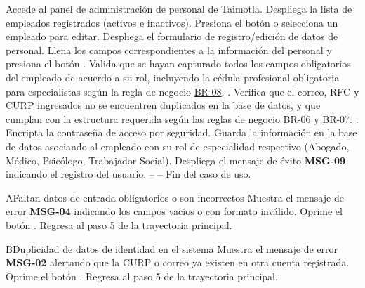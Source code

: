  \begin{UCtrayectoria}
 	\UCpaso[\UCactor] Accede al panel de administración de personal de Taimotla.
 	\UCpaso Despliega la lista de empleados registrados (activos e inactivos).
 	\UCpaso[\UCactor] Presiona el botón  o selecciona un empleado para editar.
 	\UCpaso Despliega el formulario de registro/edición de datos de personal.
 	\UCpaso[\UCactor] Llena los campos correspondientes a la información del personal y presiona el botón .
 	\UCpaso Valida que se hayan capturado todos los campos obligatorios del empleado de acuerdo a su rol, incluyendo la cédula profesional obligatoria para especialistas según la regla de negocio \hyperlink{BR-08}{BR-08}. .
 	\UCpaso Verifica que el correo, RFC y CURP ingresados no se encuentren duplicados en la base de datos, y que cumplan con la estructura requerida según las reglas de negocio \hyperlink{BR-06}{BR-06} y \hyperlink{BR-07}{BR-07}. .
 	\UCpaso Encripta la contraseña de acceso por seguridad.
 	\UCpaso Guarda la información en la base de datos asociando al empleado con su rol de especialidad respectivo (Abogado, Médico, Psicólogo, Trabajador Social).
 	\UCpaso Despliega el mensaje de éxito {\bf MSG-09} indicando el registro del usuario.
 	\UCpaso[] -- -- Fin del caso de uso.
 \end{UCtrayectoria}

\begin{UCtrayectoriaA}{A}{Faltan datos de entrada obligatorios o son incorrectos}
	\UCpaso Muestra el mensaje de error {\bf MSG-04} indicando los campos vacíos o con formato inválido.
	\UCpaso[\UCactor] Oprime el botón .
	\UCpaso Regresa al paso 5 de la trayectoria principal.
\end{UCtrayectoriaA}

\begin{UCtrayectoriaA}{B}{Duplicidad de datos de identidad en el sistema}
	\UCpaso Muestra el mensaje de error {\bf MSG-02} alertando que la CURP o correo ya existen en otra cuenta registrada.
	\UCpaso[\UCactor] Oprime el botón .
	\UCpaso Regresa al paso 5 de la trayectoria principal.
\end{UCtrayectoriaA}
